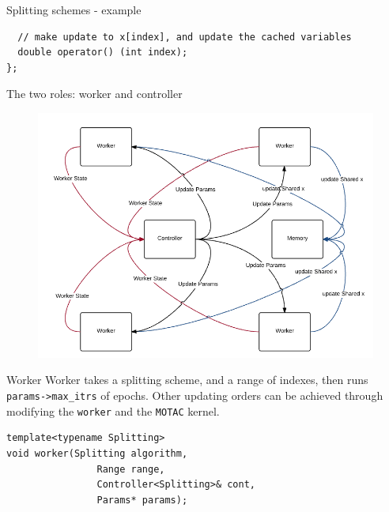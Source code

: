 \documentclass[hyperref,handout,compress,9pt,mathserif]{beamer}
\begin{document}
\begin{frame}[fragile]{Splitting schemes - example}
\begin{small}
\begin{lstlisting}
  // make update to x[index], and update the cached variables                                                                                                                                                                                   
  double operator() (int index);                                                                                                                                          
};                                                                                                                                                                                   
\end{lstlisting}
\end{small}

\end{frame}


\begin{frame}{The two roles: worker and controller}
\begin{figure}[!h]
        \centering
                \includegraphics[width=.95\textwidth]{./figs/shared_arch.png}
\end{figure}
\end{frame}

\begin{frame}[fragile]{Worker}
Worker takes a splitting scheme, and a range of indexes, then runs \texttt{params->max\_itrs} of epochs. Other updating orders can be achieved through modifying the \texttt{worker} and the \texttt{MOTAC} kernel.
\begin{lstlisting}
template<typename Splitting>
void worker(Splitting algorithm, 
	            Range range, 
	            Controller<Splitting>& cont, 
	            Params* params);
\end{lstlisting}

\end{frame}
\end{document}

